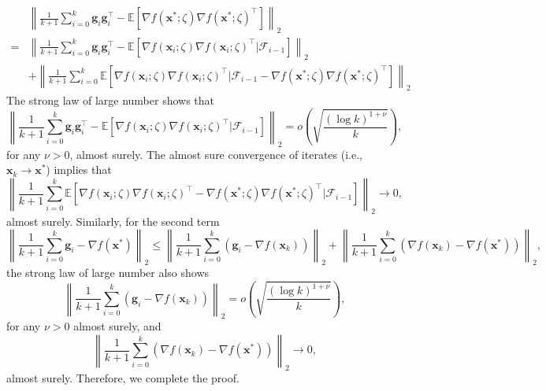 \documentclass[aos]{imsart}
\numberwithin{equation}{section}
\theoremstyle{plain}
\begin{document}
\begin{appendix}
    \begin{equation*}
        \begin{split}
            & \left\|  \frac{1}{k+1}\sum_{i=0}^{k} \bm{g}_i  \bm{g}_i^{\top} - \mathbb{E} \left[ \nabla f(\bm{x}^{*};\zeta)   \nabla f(\bm{x}^{*};\zeta)^{\top} \right]\right\|_2 \\
            = & \left\|  \frac{1}{k+1}\sum_{i=0}^{k} \bm{g}_i  \bm{g}_i^{\top} - \mathbb{E} \left[ \nabla f(\bm{x}_{i};\zeta)   \nabla f(\bm{x}_{i};\zeta)^{\top} | \mathcal{F}_{i-1}\right]\right\|_2 \\
            & + \left\|  \frac{1}{k+1}\sum_{i=0}^{k}   \mathbb{E} \left[ \nabla f(\bm{x}_{i};\zeta)   \nabla f(\bm{x}_{i};\zeta)^{\top} | \mathcal{F}_{i-1} - \nabla f(\bm{x}^{*};\zeta)   \nabla f(\bm{x}^{*};\zeta)^{\top} \right]\right\|_2
        \end{split}
    \end{equation*}
    The strong law of large number shows that
    \begin{equation*}
         \left\|  \frac{1}{k+1}\sum_{i=0}^{k} \bm{g}_i  \bm{g}_i^{\top} - \mathbb{E} \left[ \nabla f(\bm{x}_{i};\zeta)   \nabla f(\bm{x}_{i};\zeta)^{\top} | \mathcal{F}_{i-1}\right]\right\|_2 = o\left( \sqrt{\frac{\left( \log k \right)^{1+\nu}}{k}} \right),
    \end{equation*}
    for any $\nu >0$, almost surely. The almost sure convergence of iterates (i.e., $\bm{x}_k \to \bm{x}^{*}$) implies that 
    \begin{equation*}
        \left\|  \frac{1}{k+1}\sum_{i=0}^{k}   \mathbb{E} \left[ \nabla f(\bm{x}_{i};\zeta)   \nabla f(\bm{x}_{i};\zeta)^{\top} - \nabla f(\bm{x}^{*};\zeta)   \nabla f(\bm{x}^{*};\zeta)^{\top} | \mathcal{F}_{i-1} \right]\right\|_2 \to 0,
    \end{equation*}
   almost surely. Similarly, for the second term
    \begin{equation*}
        \left\|\frac{1}{k+1}\sum_{i=0}^{k} \bm{g}_i - \nabla f(\bm{x}^{*}) \right\|_2 \leq   \left\|\frac{1}{k+1}\sum_{i=0}^{k} \left( \bm{g}_i - \nabla f(\bm{x}_{k}) \right) \right\|_2 +  \left\|\frac{1}{k+1}\sum_{i=0}^{k}  \left(\nabla f(\bm{x}_{k})  - \nabla f(\bm{x}^{*})  \right) \right\|_2,
    \end{equation*}
    the strong law of large number also shows
    \begin{equation*}
        \left\|\frac{1}{k+1}\sum_{i=0}^{k} \left( \bm{g}_i - \nabla f(\bm{x}_{k}) \right) \right\|_2 = o\left( \sqrt{\frac{\left( \log k \right)^{1+\nu}}{k}} \right),
    \end{equation*}
    for any $\nu > 0$ almost surely, 
    and
    \begin{equation*}
        \left\|\frac{1}{k+1}\sum_{i=0}^{k}  \left(\nabla f(\bm{x}_{k})  - \nabla f(\bm{x}^{*})  \right) \right\|_2 \to 0,
    \end{equation*}
    almost surely. Therefore, we complete the proof. 

    
\end{appendix}
\end{document}

